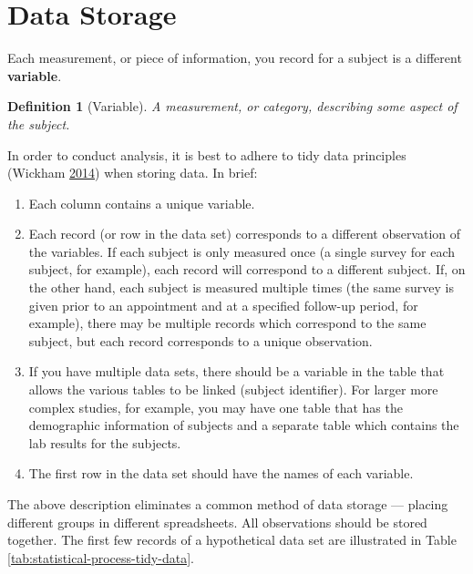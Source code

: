 \documentclass[
]{book}
\theoremstyle{plain}
\theoremstyle{mydefn}
\newtheorem{definition}{Definition}[chapter]
\theoremstyle{myexmpl}
\theoremstyle{remark}
\begin{document}
\hypertarget{data-storage}{%
\section{Data Storage}\label{data-storage}}

Each measurement, or piece of information, you record for a subject is a different \textbf{variable}.

\begin{definition}[Variable]
\protect\hypertarget{def:defn-variable}{}{\label{def:defn-variable} {} }A measurement, or category, describing some aspect of the subject.
\end{definition}

In order to conduct analysis, it is best to adhere to tidy data principles (Wickham \protect\hyperlink{ref-Wickham2014}{2014}) when storing data. In brief:

\begin{enumerate}
\def\labelenumi{\arabic{enumi}.}
\item
  Each column contains a unique variable.
\item
  Each record (or row in the data set) corresponds to a different observation of the variables. If each subject is only measured once (a single survey for each subject, for example), each record will correspond to a different subject. If, on the other hand, each subject is measured multiple times (the same survey is given prior to an appointment and at a specified follow-up period, for example), there may be multiple records which correspond to the same subject, but each record corresponds to a unique observation.
\item
  If you have multiple data sets, there should be a variable in the table that allows the various tables to be linked (subject identifier). For larger more complex studies, for example, you may have one table that has the demographic information of subjects and a separate table which contains the lab results for the subjects.
\item
  The first row in the data set should have the names of each variable.
\end{enumerate}

The above description eliminates a common method of data storage --- placing different groups in different spreadsheets. All observations should be stored together. The first few records of a hypothetical data set are illustrated in Table \ref{tab:statistical-process-tidy-data}.
\end{document}

